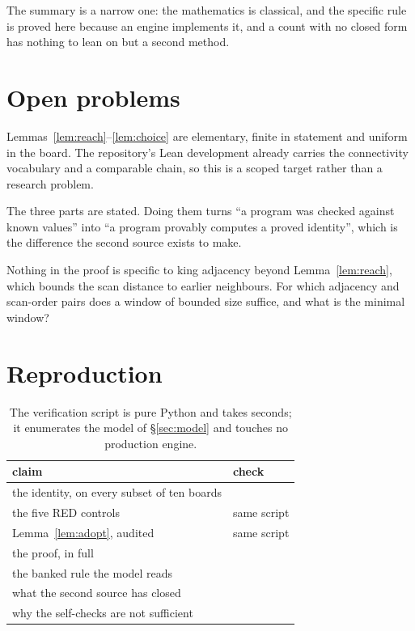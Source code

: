 \documentclass[11pt]{article}
\begin{document}
The summary is a narrow one: the mathematics is classical, and the specific rule is proved
here because an engine implements it, and a count with no closed form has
nothing to lean on but a second method.

\section{Open problems}

\begin{openproblem}
Lemmas~\ref{lem:reach}--\ref{lem:choice} are elementary, finite in statement and
uniform in the board. The repository's Lean development already carries the
connectivity vocabulary and a comparable chain, so this is a scoped target rather
than a research problem.
\end{openproblem}

\begin{openproblem}
The three parts are stated. Doing them turns ``a program was checked against
known values'' into ``a program provably computes a proved identity'', which is
the difference the second source exists to make.
\end{openproblem}

\begin{openproblem}
Nothing in the proof is specific to king adjacency beyond
Lemma~\ref{lem:reach}, which bounds the scan distance to earlier neighbours. For
which adjacency and scan-order pairs does a window of bounded size suffice, and
what is the minimal window?
\end{openproblem}

\section{Reproduction}
\label{sec:repro}

\begin{table}[H]
\centering\small
\begin{tabular}{@{}l R{0.56\textwidth}@{}}
\toprule
claim & check \\
\midrule
the identity, on every subset of ten boards &  \\
the five RED controls & same script \\
Lemma~\ref{lem:adopt}, audited & same script \\
the proof, in full &  \\
the banked rule the model reads &  \\
what the second source has closed &  \\
why the self-checks are not sufficient &  \\
\bottomrule
\end{tabular}
\caption{The verification script is pure Python and takes seconds; it enumerates
the model of \S\ref{sec:model} and touches no production engine.}
\label{tab:repro}
\end{table}



\end{document}

